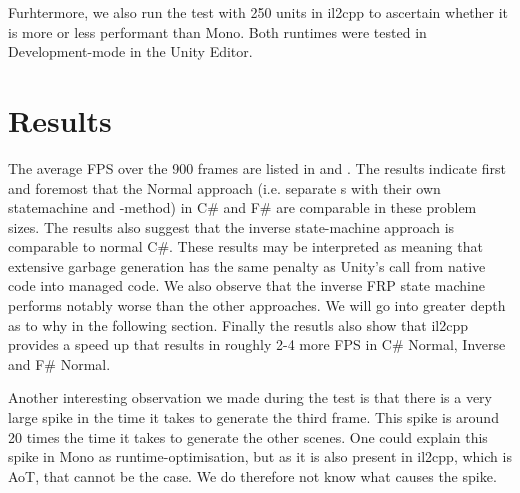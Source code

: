 Furhtermore, we also run the test with 250 units in il2cpp to ascertain whether it is more or less performant than Mono. Both runtimes were tested in Development-mode in the Unity Editor.

\section{Results}
The average \gls{FPS} over the 900 frames are listed in  and . The results indicate first and foremost that the Normal approach (i.e. separate s with their own statemachine and -method) in C\# and F\# are comparable in these problem sizes. The results also suggest that the inverse state-machine approach is comparable to normal C\#. These results may be interpreted as meaning that extensive garbage generation has the same penalty as Unity's call from native code into managed code. We also observe that the inverse FRP state machine performs notably worse than the other approaches. We will go into greater depth as to why in the following section. Finally the resutls also show that il2cpp provides a speed up that results in roughly 2-4 more \gls{FPS} in C\# Normal, Inverse and F\# Normal.

Another interesting observation we made during the test is that there is a very large spike in the time it takes to generate the third frame. This spike is around 20 times the time it takes to generate the other scenes. One could explain this spike in Mono as runtime-optimisation, but as it is also present in il2cpp, which is \gls{AoT}, that cannot be the case. We do therefore not know what causes the spike.



